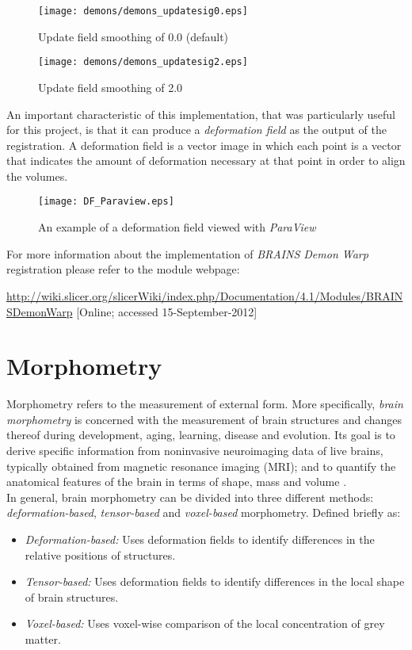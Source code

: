 \begin{figure}[H]
  \centering
  \texttt{[image: demons/demons\_updatesig0.eps]}
  \caption{Update field smoothing of 0.0 (default)}
  \label{uf_0}
\end{figure}

\begin{figure}[H]
  \centering
  \texttt{[image: demons/demons\_updatesig2.eps]}
  \caption{Update field smoothing of 2.0}
  \label{uf_2}
\end{figure}

An important characteristic of this implementation, that was
particularly useful for this project, is that it can produce a
\textit{deformation field} as the output of the registration. A
deformation field is a vector image in which each point is a vector
that indicates the amount of deformation necessary
at that point in order to align the volumes.\\

\begin{figure}[H]
  \centering
  \texttt{[image: DF\_Paraview.eps]}
  \caption{An example of a deformation field viewed with \textit{ParaView}}
  \label{voxel_ex_5}
\end{figure}


For more information about the implementation of
\textit{BRAINS Demon Warp} registration please refer to the module
webpage:

\url{http://wiki.slicer.org/slicerWiki/index.php/Documentation/4.1/Modules/BRAINSDemonWarp}
[Online; accessed 15-September-2012]

\section{Morphometry}
Morphometry refers to the measurement of external form. More
specifically, \textit{brain morphometry} is concerned with the
measurement of brain structures and changes thereof during
development, aging, learning, disease and evolution. Its goal is to
derive specific information from noninvasive neuroimaging data of live
brains, typically obtained from magnetic resonance imaging (MRI); and
to quantify the anatomical features of the brain in terms of shape,
mass and volume \cite{brmorph}.\\

In general, brain morphometry can be divided into three different methods: \textit{deformation-based}, \textit{tensor-based} and \textit{voxel-based} morphometry. Defined briefly as:
\begin{itemize}
\item \textit{Deformation-based:} Uses deformation fields to identify differences in the relative positions of structures.
\item \textit{Tensor-based:} Uses deformation fields to identify differences in the local shape of brain structures.
\item \textit{Voxel-based:} Uses voxel-wise comparison of the local concentration of grey matter.
\end{itemize}


